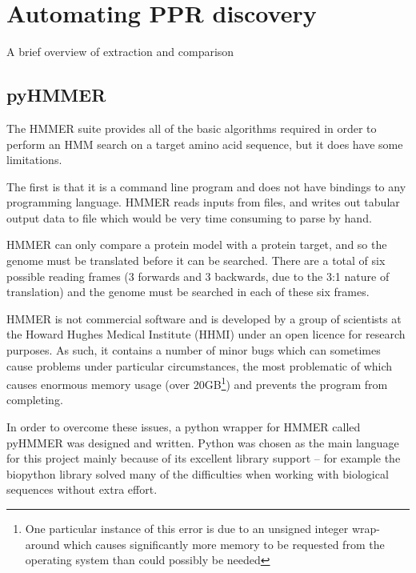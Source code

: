 
\chapter{Automating PPR discovery} 
\label{chap:methods}

A brief overview of extraction and comparison

\section{pyHMMER}
\label{ssec:pyHMMER}

The HMMER suite provides all of the basic algorithms required in order to
perform an HMM search on a target amino acid sequence, but it does have some
limitations.

The first is that it is a command line program and does not have bindings to
any programming language.
HMMER reads inputs from files, and writes out tabular output data to file which
would be very time consuming to parse by hand.

HMMER can only compare a protein model with a protein
target, and so the genome must be translated before it can be searched.
There are a total of six possible reading frames (3 forwards and 3 backwards, 
due to the 3:1 nature of translation) and the genome must be searched in each
of these six frames.

HMMER is not commercial software and is developed by a group of scientists at
the Howard Hughes Medical Institute (HHMI) under an open licence for research
purposes.
As such, it contains a number of minor bugs which can sometimes cause problems
under particular circumstances, the most problematic of which causes enormous
memory usage (over 20GB\footnote{One particular instance of this error is due
to an unsigned integer wrap-around which causes significantly more memory to be
requested from the operating system than could possibly be needed}) and
prevents the program from completing.

In order to overcome these issues, a python wrapper for HMMER called
pyHMMER was designed and written.
Python was chosen as the main language for this project mainly because of its
excellent library support -- for example the biopython library solved many of 
the difficulties when working with biological sequences without extra effort.

